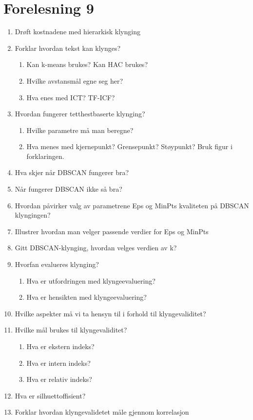 	\section{Forelesning 9}

		\begin{enumerate}
			\item Drøft kostnadene med hierarkisk klynging
			\item Forklar hvordan tekst kan klynges?
				\begin{enumerate}
					\item Kan k-means brukes? Kan HAC brukes?
					\item Hvilke avstansmål egne seg her?
					\item Hva enes med ICT? TF-ICF?
				\end{enumerate}
			\item Hvordan fungerer tetthestbaserte klynging?
				\begin{enumerate}
					\item Hvilke parametre må man beregne?
					\item Hva menes med kjernepunkt? Grensepunkt? Støypunkt? Bruk figur i forklaringen.
				\end{enumerate}
			\item Hva skjer når DBSCAN fungerer bra?
			\item Når fungerer DBSCAN ikke så bra?
			\item Hvordan påvirker valg av parametrene Eps og MinPts kvaliteten på DBSCAN
			klyngingen?
			\item Illustrer hvordan man velger passende verdier for Eps og MinPts
			\item Gitt DBSCAN-klynging, hvordan velges verdien av k?
			\item Hvorfan evalueres klynging?
				\begin{enumerate}
					\item Hva er utfordringen med klyngeevaluering?
					\item Hva er hensikten med klyngeevaluering?
				\end{enumerate}
			\item Hvilke aspekter må vi ta hensyn til i forhold til klyngevaliditet?
			\item Hvilke mål brukes til klyngevaliditet?
				\begin{enumerate}
					\item Hva er ekstern indeks?
					\item Hva er intern indeks?
					\item Hva er relativ indeks?
				\end{enumerate}
			\item Hva er silhuettoffisient?
			\item Forklar hvordan klyngevalidetet måle gjennom korrelasjon
		\end{enumerate}
